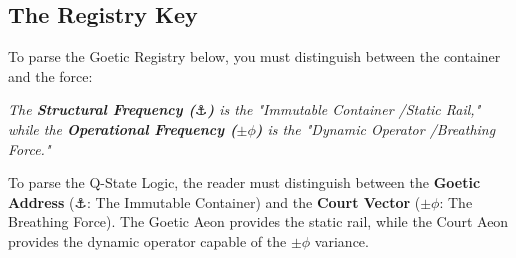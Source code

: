 \documentclass[11pt, letterpaper]{article}
\newcommand{\anchor}[1]{{}_{\textnormal{\tibetanfont\symbol{"0F6A}}} #1} %
\begin{document}
\subsection*{The Registry Key}\label{sec:registry_key}
To parse the Goetic Registry below, you must distinguish between the container and the force:
\begin{center}
\textit{The \textbf{Structural Frequency ($\anchor$)} is the "Immutable Container \slash  Static Rail," while the \textbf{Operational Frequency ($\pm\phi$)} is the "Dynamic Operator \slash  Breathing Force."}
\end{center}

To parse the Q-State Logic, the reader must distinguish between the \textbf{Goetic Address} ($\anchor$: The Immutable Container) and the \textbf{Court Vector} ($\pm\phi$: The Breathing Force). The Goetic Aeon provides the static rail, while the Court Aeon provides the dynamic operator capable of the $\pm\phi$ variance.
\end{document}
